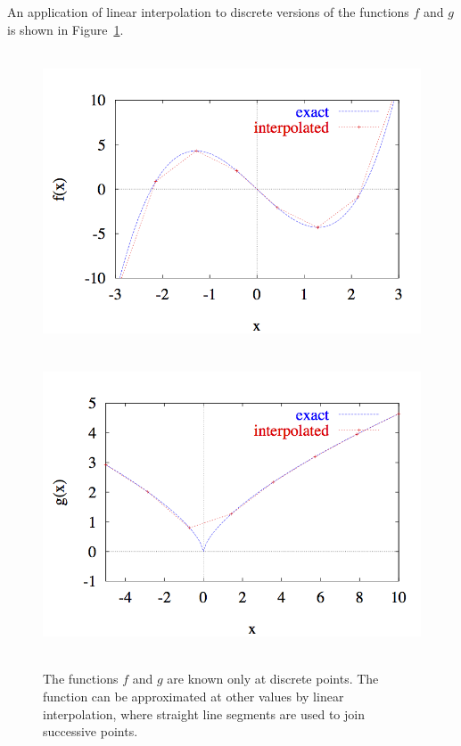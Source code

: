 \begin{example}
  An application of linear interpolation to  discrete versions of
  the functions $f$ and $g$ is shown in
  Figure~\ref{lab1:fig:discrete-f}.
  \begin{figure}[htbp]
    \begin{center}
      \leavevmode
      \includegraphics[height=3.5in]{discrete/f}
      \includegraphics[height=3.5in]{discrete/g}
      \caption{The functions $f$ and $g$ are known only at discrete
        points.  The function can be approximated at other values by
        linear interpolation, where straight line segments are used
        to join successive points.}
      \label{lab1:fig:discrete-f}
    \end{center}
  \end{figure}


\end{example}
